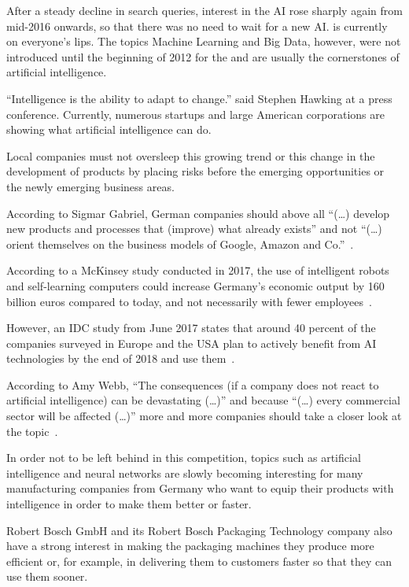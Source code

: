 After a steady decline in search queries, interest in the AI rose sharply again from mid-2016 onwards, so that there was
no need to wait for a new AI. is currently on everyone's lips. The topics Machine Learning and Big Data, however, were
not introduced until the beginning of 2012 for the and are usually the cornerstones of artificial intelligence.

\enquote{Intelligence is the ability to adapt to change.} said Stephen Hawking at a press conference. Currently,
numerous startups and large American corporations are showing what artificial intelligence can do.

Local companies must not oversleep this growing trend or this change in the development of products by placing risks
before the emerging opportunities or the newly emerging business areas.

According to Sigmar Gabriel, German companies should above all \enquote{(\ldots) develop new products and processes that
(improve) what already exists} and not \enquote{(\ldots) orient themselves on the business models of Google, Amazon and
Co.}~\cite{article_einleitung_ww_sg}.

According to a McKinsey study conducted in 2017, the use of intelligent robots and self-learning computers could
increase Germany's economic output by 160 billion euros compared to today, and not necessarily with fewer
employees~\cite{online_einleitung_mckinsey}.

However, an IDC study from June 2017 states that around 40 percent of the companies surveyed in Europe and the USA plan
to actively benefit from AI technologies by the end of 2018 and use them~\cite{article_grundlagen_salesforce}.

According to Amy Webb, \enquote{The consequences (if a company does not react to artificial intelligence) can be
devastating (\ldots)} and because \enquote{(\ldots) every commercial sector will be affected (\ldots)} more and more
companies should take a closer look at the topic~\cite{article_einleitung_dub_aw}.

In order not to be left behind in this competition, topics such as artificial intelligence and neural networks are
slowly becoming interesting for many manufacturing companies from Germany who want to equip their products with
intelligence in order to make them better or faster.

Robert Bosch GmbH and its Robert Bosch Packaging Technology company also have a strong interest in making the packaging
machines they produce more efficient or, for example, in delivering them to customers faster so that they can use them
sooner.

